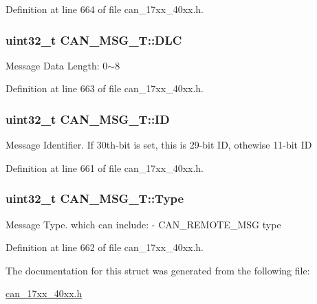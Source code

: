 Definition at line 664 of file can\+\_\+17xx\+\_\+40xx.\+h.

\subsubsection[{\texorpdfstring{D\+LC}{DLC}}]{\setlength{\rightskip}{0pt plus 5cm}uint32\+\_\+t C\+A\+N\+\_\+\+M\+S\+G\+\_\+\+T\+::\+D\+LC}\hypertarget{structCAN__MSG__T_a39963b19d3cb9885a5e984a6805f2674}{}\label{structCAN__MSG__T_a39963b19d3cb9885a5e984a6805f2674}
Message Data Length\+: 0$\sim$8 

Definition at line 663 of file can\+\_\+17xx\+\_\+40xx.\+h.

\subsubsection[{\texorpdfstring{ID}{ID}}]{\setlength{\rightskip}{0pt plus 5cm}uint32\+\_\+t C\+A\+N\+\_\+\+M\+S\+G\+\_\+\+T\+::\+ID}\hypertarget{structCAN__MSG__T_a7fbb2453bed19c5b143fb7336a697622}{}\label{structCAN__MSG__T_a7fbb2453bed19c5b143fb7336a697622}
Message Identifier. If 30th-\/bit is set, this is 29-\/bit ID, othewise 11-\/bit ID 

Definition at line 661 of file can\+\_\+17xx\+\_\+40xx.\+h.

\subsubsection[{\texorpdfstring{Type}{Type}}]{\setlength{\rightskip}{0pt plus 5cm}uint32\+\_\+t C\+A\+N\+\_\+\+M\+S\+G\+\_\+\+T\+::\+Type}\hypertarget{structCAN__MSG__T_a2c15ca6deba6d985f7d8d24caec2fb3b}{}\label{structCAN__MSG__T_a2c15ca6deba6d985f7d8d24caec2fb3b}
Message Type. which can include\+: -\/ C\+A\+N\+\_\+\+R\+E\+M\+O\+T\+E\+\_\+\+M\+SG type 

Definition at line 662 of file can\+\_\+17xx\+\_\+40xx.\+h.



The documentation for this struct was generated from the following file\+:\begin{DoxyCompactItemize}
\item 
\hyperlink{can__17xx__40xx_8h}{can\+\_\+17xx\+\_\+40xx.\+h}\end{DoxyCompactItemize}
